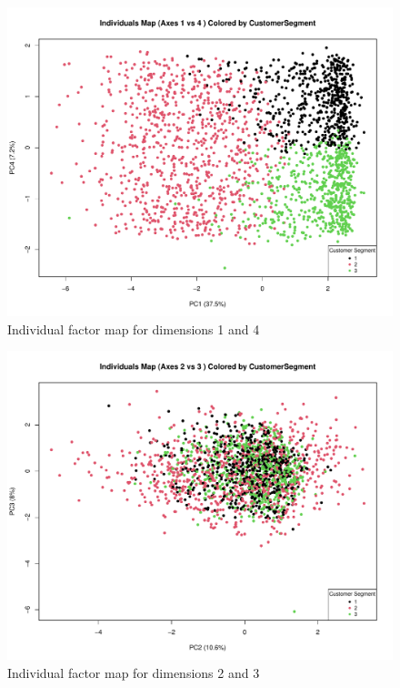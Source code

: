 \begin{figure}[H]
    \centering
    \includegraphics[width=0.8\linewidth]{Imatges/individuals_map_1_4.pdf}
    \caption{Individual factor map for dimensions 1 and 4}
    \label{fig:individuals_map_1_4}
\end{figure}

\begin{figure}[H]
    \centering
    \includegraphics[width=0.8\linewidth]{Imatges/individuals_map_2_3.pdf}
    \caption{Individual factor map for dimensions 2 and 3}
    \label{fig:individuals_map_2_3}
\end{figure}

